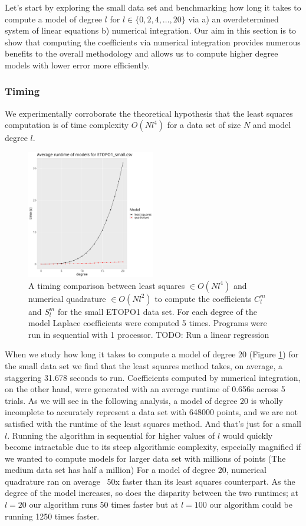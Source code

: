 \documentclass[a4paper]{article}
\theoremstyle{definition}
\begin{document}
Let's start by exploring the small data set and benchmarking how long it takes to compute a model of degree $l$ for $l \in \{0, 2, 4, \dots, 20\}$ via 
a) an overdetermined system of linear equations b) numerical integration. Our aim in this section is to show that computing the coefficients via numerical integration
provides numerous benefits to the overall methodology and allows us to compute higher degree models with lower error more efficiently.

\subsubsection{Timing}


We experimentally corroborate the theoretical hypothesis that the least squares computation is of time complexity $O(Nl^4)$ for a data set of size $N$ and 
model degree $l$.

\begin{figure}[h!]
    \centering
    \includegraphics[width=0.5\textwidth]{media/average_runtime.png}
    \caption{A timing comparison between least squares $\in O(Nl^4)$ and numerical quadrature $\in O(Nl^2)$ to compute the coefficients $C_l^m$ and $S_l^m$ for the small ETOPO1 data set. 
    For each degree of the model Laplace coefficients were computed 5 times. Programs were run in sequential with 1 processor. TODO: Run a linear regression}
    \label{fig:runtime}
\end{figure}


When we study how long it takes to compute a model of degree 20 (Figure \ref{fig:runtime}) for the small data set we find that the least squares method takes, on average, a staggering 31.678 seconds to run. 
Coefficients computed by numerical integration, on the other hand, were generated with an average runtime of 0.656s across
5 trials. As we will see in the following analysis, a model of degree 20 is wholly incomplete to accurately represent a data set with 648000 points, and we are not 
satisfied with the runtime of the least squares method. And that's just for a small $l$. Running the algorithm in sequential for higher values of $l$ would quickly become
intractable due to its steep algorithmic complexity, especially magnified if we wanted to compute models for larger data set with millions of points (The medium data set has half a million) For a model of degree 20, numerical quadrature ran on average ~50x faster than its least squares counterpart. As the degree
of the model increases, so does the disparity between the two runtimes; at $l=20$ our algorithm runs 50 times faster but at $l = 100$ our algorithm could be running 1250 times faster.
\end{document}
